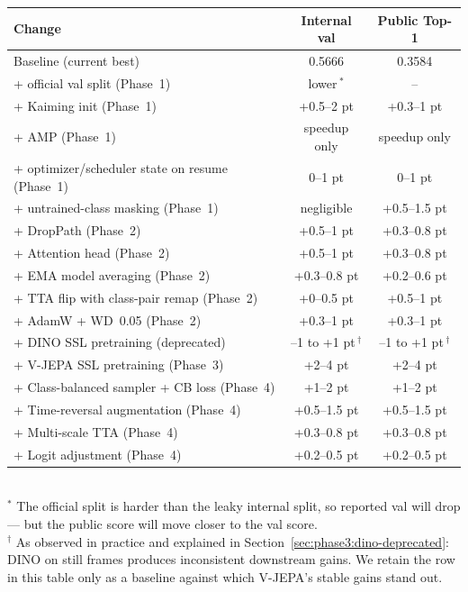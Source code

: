 \begin{center}\small
\begin{tabular}{lcc}
\toprule
\textbf{Change} & \textbf{Internal val} & \textbf{Public Top-1} \\
\midrule
Baseline (current best)                        & 0.5666 & 0.3584 \\
+ official val split (Phase~1)                 & lower\,$^*$ & --     \\
+ Kaiming init (Phase~1)                       & +0.5--2 pt & +0.3--1 pt \\
+ AMP (Phase~1)                                & speedup only & speedup only \\
+ optimizer/scheduler state on resume (Phase~1)& 0--1 pt & 0--1 pt \\
+ untrained-class masking (Phase~1)            & negligible & +0.5--1.5 pt \\
+ DropPath (Phase~2)                           & +0.5--1 pt & +0.3--0.8 pt \\
+ Attention head (Phase~2)                     & +0.5--1 pt & +0.3--0.8 pt \\
+ EMA model averaging (Phase~2)                & +0.3--0.8 pt & +0.2--0.6 pt \\
+ TTA flip with class-pair remap (Phase~2)     & +0--0.5 pt & +0.5--1 pt \\
+ AdamW + WD~0.05 (Phase~2)                    & +0.3--1 pt & +0.3--1 pt \\
+ DINO SSL pretraining (deprecated)            & --1 to +1 pt\,$^\dagger$ & --1 to +1 pt\,$^\dagger$ \\
+ V-JEPA SSL pretraining (Phase~3)             & +2--4 pt & +2--4 pt \\
+ Class-balanced sampler + CB loss (Phase~4)   & +1--2 pt & +1--2 pt \\
+ Time-reversal augmentation (Phase~4)         & +0.5--1.5 pt & +0.5--1.5 pt \\
+ Multi-scale TTA (Phase~4)                    & +0.3--0.8 pt & +0.3--0.8 pt \\
+ Logit adjustment (Phase~4)                   & +0.2--0.5 pt & +0.2--0.5 pt \\
\bottomrule
\end{tabular}\\
\smallskip
{\footnotesize $^*$ The official split is harder than the leaky
internal split, so reported val will drop --- but the public score will
move closer to the val score.\\
$^\dagger$ As observed in practice and explained in
Section~\ref{sec:phase3:dino-deprecated}: DINO on still frames produces
inconsistent downstream gains. We retain the row in this table only as
a baseline against which V-JEPA's stable gains stand out.}
\end{center}

